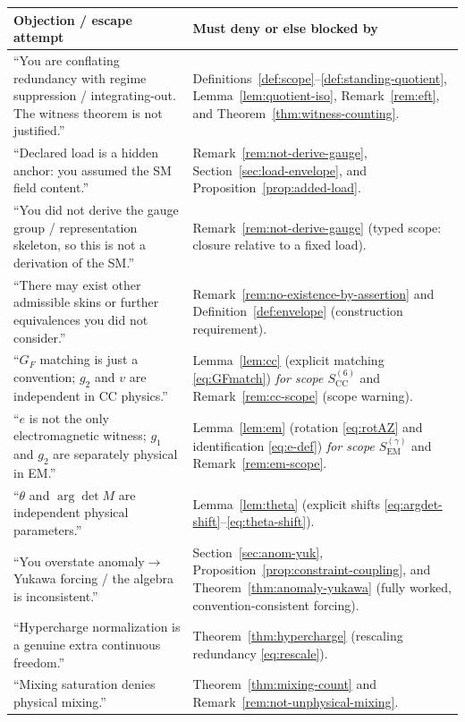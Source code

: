 \documentclass[11pt]{article}
\theoremstyle{remark}
\newcommand{\CC}{\ensuremath{\mathrm{CC}}}
\newcommand{\EM}{\ensuremath{\mathrm{EM}}}
\begin{document}
\begin{center}
\small
\begin{tabular}{@{}p{}p{}@{}}
\toprule
\textbf{Objection / escape attempt} & \textbf{Must deny or else blocked by} \\
\midrule
``You are conflating redundancy with regime suppression / integrating-out. The witness theorem is not justified.'' &
Definitions~\ref{def:scope}--\ref{def:standing-quotient}, Lemma~\ref{lem:quotient-iso},
Remark~\ref{rem:eft}, and Theorem~\ref{thm:witness-counting}.\\
``Declared load is a hidden anchor: you assumed the SM field content.'' &
Remark~\ref{rem:not-derive-gauge}, Section~\ref{sec:load-envelope}, and Proposition~\ref{prop:added-load}.\\
``You did not derive the gauge group / representation skeleton, so this is not a derivation of the SM.'' &
Remark~\ref{rem:not-derive-gauge} (typed scope: closure relative to a fixed load).\\
``There may exist other admissible skins or further equivalences you did not consider.'' &
Remark~\ref{rem:no-existence-by-assertion} and Definition~\ref{def:envelope} (construction requirement).\\
``$G_F$ matching is just a convention; $g_2$ and $v$ are independent in CC physics.'' &
Lemma~\ref{lem:cc} (explicit matching \eqref{eq:GFmatch}) \emph{for scope $S_{\CC}^{(6)}$} and
Remark~\ref{rem:cc-scope} (scope warning).\\
``$e$ is not the only electromagnetic witness; $g_1$ and $g_2$ are separately physical in EM.'' &
Lemma~\ref{lem:em} (rotation \eqref{eq:rotAZ} and identification \eqref{eq:e-def}) \emph{for scope
$S_{\EM}^{(\gamma)}$} and Remark~\ref{rem:em-scope}.\\
``$\theta$ and $\arg\det M$ are independent physical parameters.'' &
Lemma~\ref{lem:theta} (explicit shifts \eqref{eq:argdet-shift}--\eqref{eq:theta-shift}).\\
``You overstate anomaly$\to$Yukawa forcing / the algebra is inconsistent.'' &
Section~\ref{sec:anom-yuk}, Proposition~\ref{prop:constraint-coupling}, and
Theorem~\ref{thm:anomaly-yukawa} (fully worked, convention-consistent forcing).\\
``Hypercharge normalization is a genuine extra continuous freedom.'' &
Theorem~\ref{thm:hypercharge} (rescaling redundancy \eqref{eq:rescale}).\\
``Mixing saturation denies physical mixing.'' &
Theorem~\ref{thm:mixing-count} and Remark~\ref{rem:not-unphysical-mixing}.\\

\end{tabular}
\end{center}
\end{document}
